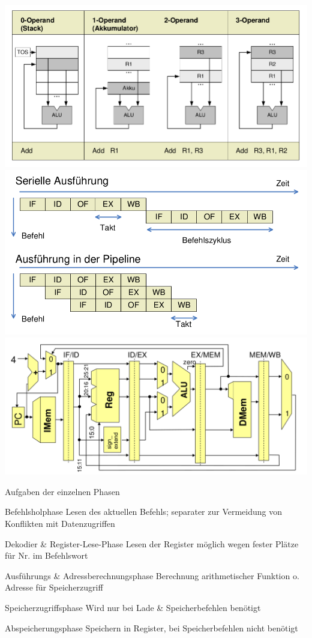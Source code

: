 \documentclass[a4paper]{article}
\begin{document}
\begin{multicols}{3}
  \begin{center}
    \includegraphics[width=\textwidth/7]{Assets/RA2_Operanden.png}
    \includegraphics[width=\textwidth/7]{Assets/RA2_pipelineCPU.png}
    \includegraphics[width=\textwidth/4]{Assets/RA2_mehrzyklenCPU.png}
  \end{center}
  
  Aufgaben der einzelnen Phasen
  \begin{description*}
    \item[Befehlsholphase] Lesen des aktuellen Befehls; separater zur Vermeidung von Konflikten mit Datenzugriffen
    \item[Dekodier \& Register-Lese-Phase] Lesen der Register möglich wegen fester Plätze für Nr. im Befehlswort
    \item[Ausführungs \& Adressberechnungsphase] Berechnung arithmetischer Funktion o. Adresse für Speicherzugriff
    \item[Speicherzugriffsphase] Wird nur bei Lade \& Speicherbefehlen benötigt
    \item[Abspeicherungsphase] Speichern in Register, bei Speicherbefehlen nicht benötigt
  \end{description*}
  

\end{multicols}
\end{document}
